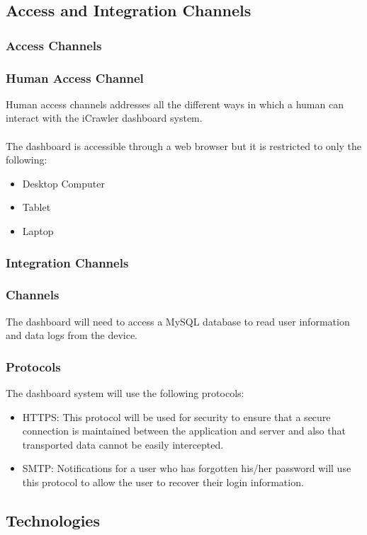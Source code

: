 	\subsection{Access and Integration Channels}
	\subsubsection{Access Channels}
	\subsubsection*{Human Access Channel}
	Human access channels addresses all the different ways in which a human can interact with the iCrawler dashboard system.\\\\ The dashboard is accessible through a web browser but it is restricted to only the following: 
	\begin{itemize}
		\item Desktop Computer
		\item Tablet
		\item Laptop  
	\end{itemize}
	\subsubsection{Integration Channels}
	\subsubsection*{Channels}
	The dashboard will need to access a MySQL database to read user information and data logs from the device. 
	\subsubsection*{Protocols}
	The dashboard system will use the following protocols:
	\begin{itemize}
	\item HTTPS: This protocol will be used for security to ensure that a secure connection is maintained between the application and server and also that transported data cannot be easily intercepted.
	\item SMTP: Notifications for a user who has forgotten his/her password will use this protocol to allow the user  to recover their login information.  
	\end{itemize}	 
	\newpage
	\subsection{Technologies}
